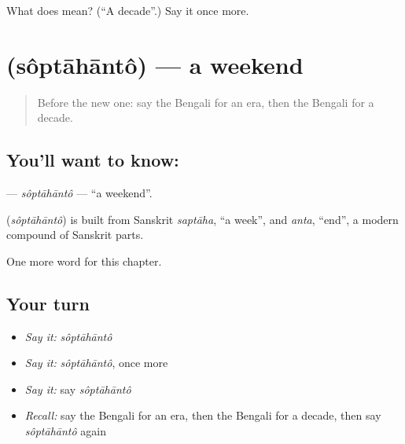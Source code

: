 \begin{tcolorbox}[breakable,colback=teal!4,colframe=teal!35!black,title={Before you move on}]
What does  mean? (\textquotedblleft{}A decade\textquotedblright{}.) Say it once more.
\end{tcolorbox}
\section[\texorpdfstring{\bn{সপ্তাহান্ত} (sôptāhāntô)}{সপ্তাহান্ত (sôptāhāntô)}]{ (sôptāhāntô) — a weekend}

\label{lesson:BN-C187-soptahanto}



\begin{quote}
Before the new one: say the Bengali for an era, then the Bengali for a decade.
\end{quote}

\subsection*{You'll want to know: }
\textbf{} — \emph{sôptāhāntô} — \textquotedblleft{}a weekend\textquotedblright{}.

\begin{cousinweb}
\textbf{} (\emph{sôptāhāntô}) is built from Sanskrit \emph{saptāha}, \textquotedblleft{}a week\textquotedblright{}, and \emph{anta}, \textquotedblleft{}end\textquotedblright{}, a modern compound of Sanskrit parts.
\end{cousinweb}

\begin{grammarlens}[title={What you've built}]
One more word for this chapter.
\end{grammarlens}

\subsection*{Your turn}
\begin{itemize}
\raggedright
  \item \emph{Say it:} \emph{sôptāhāntô}
  \item \emph{Say it:} \emph{sôptāhāntô}, once more
  \item \emph{Say it:} say \emph{sôptāhāntô}
  \item \emph{Recall:} say the Bengali for an era, then the Bengali for a decade, then say \emph{sôptāhāntô} again
\end{itemize}

